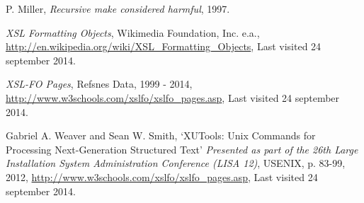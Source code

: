 \renewcommand{\bibname}{References}

\begin{thebibliography}{90}


  P. Miller,
  \emph{Recursive make considered harmful},
  1997.

  \emph{XSL Formatting Objects},
  Wikimedia Foundation, Inc. e.a., 
  \url{http://en.wikipedia.org/wiki/XSL\_Formatting\_Objects},
  Last visited 24 september 2014.

  \emph{XSL-FO Pages},
  Refsnes Data,
  1999 - 2014,
  \url{http://www.w3schools.com/xslfo/xslfo\_pages.asp},
  Last visited 24 september 2014.

  Gabriel A. Weaver and Sean W. Smith,
  `XUTools: Unix Commands for Processing Next-Generation Structured Text'
  \emph{Presented as part of the 26th Large Installation System Administration Conference (LISA 12)},
  USENIX,
  p. 83-99,
  2012,
  \url{http://www.w3schools.com/xslfo/xslfo\_pages.asp},
  Last visited 24 september 2014.

\end{thebibliography}